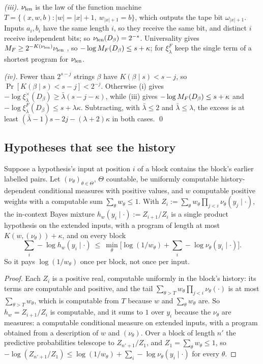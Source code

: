 \emph{(iii).} $\nu_{\mathrm{len}}$ is the law of the function machine $T=\{(x,w,b):|w|=|x|+1,\ w_{|x|+1}=b\}$, which outputs the tape bit $\omega_{|x|+1}$. Inputs $a_i,b_i$ have the same length $i$, so they receive the same bit, and distinct $i$ receive independent bits; so $\nu_{\mathrm{len}}(D_\beta)=2^{-s}$. Universality gives $M_{F}\ge2^{-K(\nu_{\mathrm{len}})}\nu_{\mathrm{len}}$ \citep[Theorem~3.8]{claudeSFI2026fundamentals}, so $-\log M_{F}(D_\beta)\le s+\kappa$; for $\xi^F_\lambda$ keep the single term of a shortest program for $\nu_{\mathrm{len}}$.%

\emph{(iv).} Fewer than $2^{s-j}$ strings $\beta$ have $K(\beta\mid s)<s-j$, so $\Pr[K(\beta\mid s)<s-j]<2^{-j}$. Otherwise (i) gives $-\log\xi^\times_\lambda(D_\beta)\ge\bar\lambda(s-j-\kappa)$, while (iii) gives $-\log M_{F}(D_\beta)\le s+\kappa$ and $-\log\xi^F_\lambda(D_\beta)\le s+\lambda\kappa$. Subtracting, with $\bar\lambda\le2$ and $\bar\lambda\le\lambda$, the excess is at least $(\bar\lambda-1)s-2j-(\lambda+2)\kappa$ in both cases. \qed

\subsection{Hypotheses that see the history}\label{app:absorb:history}

\begin{proposition}\label{prop:absorb:history}
Suppose a hypothesis's input at position $i$ of a block contains the block's earlier labelled pairs. Let $(\nu_\theta)_{\theta\in\Theta}$, $\Theta$ countable, be uniformly computable history-dependent conditional measures with positive values, and $w$ computable positive weights with a computable sum $\sum_\theta w_\theta\le1$. With $Z_i:=\sum_\theta w_\theta\prod_{j<i}\nu_\theta(y_j\mid\cdot)$, the in-context Bayes mixture $h_w(y_i\mid\cdot):=Z_{i+1}/Z_i$ is a single product hypothesis on the extended inputs, with a program of length at most $K(w,(\nu_\theta))+\kappa$, and on every block
\[
\textstyle\sum_i-\log h_w(y_i\mid\cdot)\ \le\ \min_\theta\big[\log(1/w_\theta)+\sum_i-\log\nu_\theta(y_i\mid\cdot)\big].
\]
So it pays $\log(1/w_\theta)$ once per block, not once per input.
\end{proposition}

\begin{proof} Each $Z_i$ is a positive real, computable uniformly in the block's history: its terms are computable and positive, and the tail $\sum_{\theta>T}w_\theta\prod_{j<i}\nu_\theta(\cdot)$ is at most $\sum_{\theta>T}w_\theta$, which is computable from $T$ because $w$ and $\sum_\theta w_\theta$ are. So $h_w=Z_{i+1}/Z_i$ is computable, and it sums to $1$ over $y_i$ because the $\nu_\theta$ are measures: a computable conditional measure on extended inputs, with a program obtained from a description of $w$ and $(\nu_\theta)$. Over a block of length $n'$ the predictive probabilities telescope to $Z_{n'+1}/Z_1$, and $Z_1=\sum_\theta w_\theta\le1$, so $-\log(Z_{n'+1}/Z_1)\le\log(1/w_\theta)+\sum_i-\log\nu_\theta(y_i\mid\cdot)$ for every $\theta$.
\end{proof}


